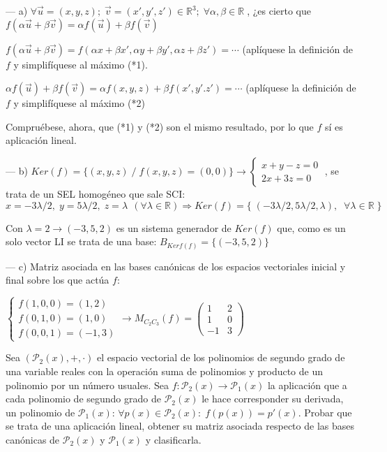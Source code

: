 \begin{proofw}\renewcommand{\qedsymbol}{$\diamond$}
	--- a) $\forall \vec u=(x,y,z);\; \vec v=(x',y',z')\in \mathbb R^3; \; \forall \alpha, \beta \in \mathbb R \;$, ¿es cierto que $  f(\alpha \vec u+\beta \vec v)=\alpha f(\vec u)+\beta f(\vec v)$

\noindent $f(\alpha \vec u+\beta \vec v)=f(\alpha x+\beta x', \alpha y+\beta y', \alpha z + \beta z')=\cdots $ (aplíquese la definición de $f$ y simplifíquese al máximo (*1).

\noindent  $\alpha f(\vec u)+\beta f(\vec v)=\alpha f(x,y,z)+\beta f(x',y'.z')=\cdots$  (aplíquese la definición de $f$ y simplifíquese al máximo (*2)

\noindent Compruébese, ahora, que (*1) y (*2) son el mismo resultado, por lo que $f$ sí es aplicación lineal.

\noindent --- b) $Ker(f)=\{(x,y,z)\; / \; f(x,y,z)=(0,0)\} \to \begin{cases} x+y-z=0\\2x+3z=0\end{cases} \;$, se trata de un SEL homogéneo que sale SCI:  $x=-3\lambda /2,\; y=5\lambda  /2, \; z=\lambda \;\, (\forall \lambda \in \mathbb R) \Rightarrow Ker(f)=\{\; (-3\lambda /2, 5\lambda  /2, \lambda),\;\; \forall \lambda \in \mathbb R \; \}$

\noindent Con $\lambda =2 \to (-3,5,2)$ es un sistema generador de $Ker(f)$ que, como es un solo vector LI se trata de una base: $B_{Kerf(f)}=\{(-3,5,2)\}$

\noindent --- c) Matriz asociada en las bases canónicas de los espacios vectoriales inicial y final sobre los que actúa $f$:

\noindent $\begin{cases} f(1,0,0)=(1,2)\\f(0,1,0)=(1,0)\\f(0,0,1)=(-1,3) \end{cases} \longrightarrow M_{C_2C_3}(f)=\left( \begin{matrix} 1&2\\1&0\\-1&3 \end{matrix} \right)$

\end{proofw}


\begin{ejre}
	Sea $(\mathcal P_2(x),+,\cdot)$ el espacio vectorial de los polinomios de segundo grado de una variable reales con la operación suma de polinomios y producto de un polinomio por un número usuales. Sea $f:\mathcal P_2(x) \to \mathcal P_1(x)$ la aplicación que a cada polinomio de segundo grado de $\mathcal P_2(x)$ le hace corresponder  su derivada, un polinomio de $\mathcal P_1(x)$: $\forall p(x)\in \mathcal P_2(x):\; f(p(x))=p'(x)$. Probar que se trata de una aplicación lineal, obtener su matriz asociada respecto de las bases canónicas  de $\mathcal P_2(x)$ y $\mathcal P_1(x)$ y  clasificarla.
\end{ejre}

